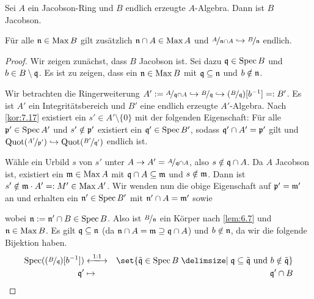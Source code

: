\documentclass[12pt,a4paper]{scrartcl}
\theoremstyle{cplain}
\theoremstyle{cdef}
\begin{document}
\begin{satz}
	Sei $A$ ein Jacobson-Ring und $B$ endlich erzeugte $A$-Algebra. Dann ist $B$ Jacobson.
	
	Für alle $\mathfrak{n} \in \operatorname{Max} B$ gilt zusätzlich $\mathfrak{n} \cap A \in \operatorname{Max} A$ und $\nicefrac{A}{\mathfrak{n} \cap A} \hookrightarrow \nicefrac{B}{\mathfrak{n}}$ endlich.
\end{satz}
\begin{proof}
	Wir zeigen zunächst, dass $B$ Jacobson ist. Sei dazu $\mathfrak{q} \in \operatorname{Spec} B$ und $b \in B \setminus \mathfrak{q}$. Es ist zu zeigen, dass ein $\mathfrak{n} \in \operatorname{Max} B$ mit $\mathfrak{q} \subseteq \mathfrak{n}$ und $b \notin \mathfrak{n}$.
	
	Wir betrachten die Ringerweiterung $A' := \nicefrac{A}{\mathfrak{q} \cap A} \hookrightarrow \nicefrac{B}{\mathfrak{q}} \hookrightarrow (\nicefrac{B}{\mathfrak{q}})[b^{-1}] =: B'$. Es ist $A'$ ein Integritätsbereich und $B'$ eine endlich erzeugte $A'$-Algebra. Nach \cref{kor:7.17} existiert ein $s' \in A' \setminus \{0\}$ mit der folgenden Eigenschaft: Für alle $\mathfrak{p}' \in \operatorname{Spec} A'$ und $s' \notin \mathfrak{p}'$ existiert ein $\mathfrak{q}' \in \operatorname{Spec} B'$, sodass $\mathfrak{q}' \cap A' = \mathfrak{p}'$ gilt und $\operatorname{Quot}(\nicefrac{A'}{\mathfrak{p}'}) \hookrightarrow \operatorname{Quot}(\nicefrac{B'}{\mathfrak{q}'})$ endlich ist.
	
	Wähle ein Urbild $s$ von $s'$ unter $A \to A' = \nicefrac{A}{\mathfrak{q} \cap A}$, also $s \notin \mathfrak{q} \cap A$. Da $A$ Jacobson ist, existiert ein $\mathfrak{m} \in \operatorname{Max} A$ mit $\mathfrak{q} \cap A \subseteq \mathfrak{m}$ und $s \notin \mathfrak{m}$. Dann ist $s' \notin \mathfrak{m} \cdot A' =: M' \in \operatorname{Max} A'$. Wir wenden nun die obige Eigenschaft auf $\mathfrak{p}'=\mathfrak{m}'$ an und erhalten ein $\mathfrak{n}' \in \operatorname{Spec} B'$ mit $\mathfrak{n}' \cap A = \mathfrak{m}'$ sowie 
	\begin{center}
	\end{center} wobei $\mathfrak{n} := \mathfrak{n}' \cap B \in \operatorname{Spec} B$. Also ist $\nicefrac{B}{\mathfrak{n}}$ ein Körper nach \cref{lem:6.7} und $\mathfrak{n} \in \operatorname{Max} B$.
	Es gilt $\mathfrak{q} \subseteq \mathfrak{n}$ (da $\mathfrak{n} \cap A = \mathfrak{m} \supseteq \mathfrak{q} \cap A$) und $b \notin \mathfrak{n}$, da wir die folgende Bijektion haben. \begin{eqnarray*}
		\Spec((\fak B\fq)[b^{-1}]) &\xlongleftrightarrow{1:1}& \set{\tilde \fq \in \Spec B \given \fq \subseteq \tilde \fq \text{ und } b \notin \tilde \fq} \\
		\fq'& \mapsto &\fq' \cap B
	\end{eqnarray*}


\end{proof}
\end{document}
